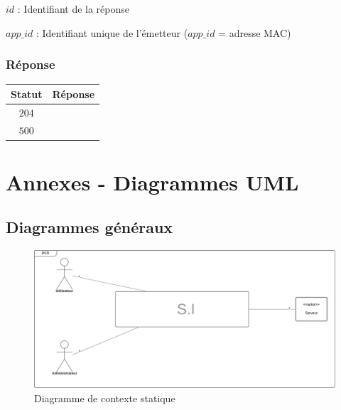 \documentclass[titlepage]{report}
\begin{document}
\par $id$ : Identifiant de la réponse
\par $app\_id$ : Identifiant unique de l’émetteur ($app\_id$ = adresse MAC)

\section{Réponse}

\begin{center}
	\begin{tabular}{|c|c|}
		\hline
		Statut & Réponse \\
		\hline
		$ 204 $ &  \\ 
		\hline
		$ 500 $ & \\
		\hline
	\end{tabular}
\end{center}


\part{Annexes - Diagrammes UML}
\label{part_allUML}

\chapter{Diagrammes généraux}

\begin{figure}[h]
	\caption{Diagramme de contexte statique}
	\label{annexe_diagramme_contexteStatique}
	\centering
	\includegraphics[width=\textwidth]{figures/diagrammes/contexteStatique.png}
\end{figure}
\end{document}
